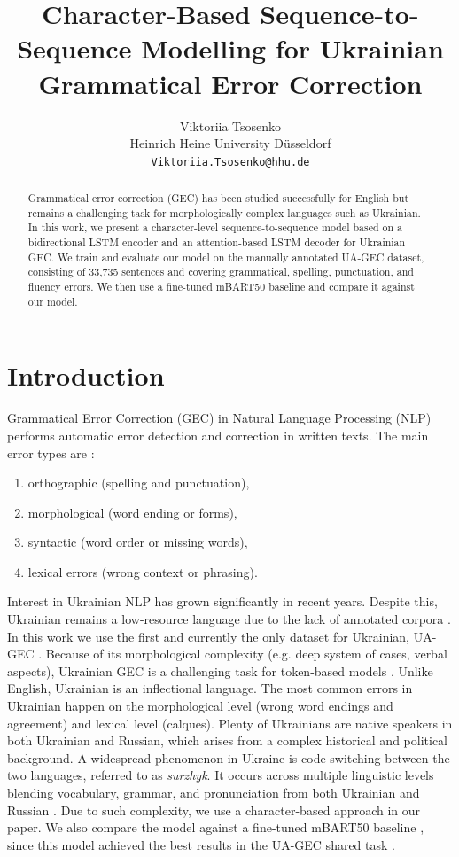 \documentclass[11pt]{article}
\title{Character-Based Sequence-to-Sequence Modelling for Ukrainian Grammatical Error Correction}
\author{Viktoriia Tsosenko \\
Heinrich Heine University D\"usseldorf \\
  \texttt{Viktoriia.Tsosenko@hhu.de} \\}
\begin{document}
\maketitle
\begin{abstract}
Grammatical error correction (GEC) has been studied successfully for English but remains a challenging task for morphologically complex languages such as Ukrainian. In this work, we present a character-level sequence-to-sequence model based on a bidirectional LSTM encoder and an attention-based LSTM decoder for Ukrainian GEC. We train and evaluate our model on the manually annotated UA-GEC dataset, consisting of 33,735 sentences and covering grammatical, spelling, punctuation, and fluency errors. We then use a fine-tuned mBART50 baseline and compare it against our model. 

\end{abstract}


\section{Introduction}
Grammatical Error Correction (GEC) in Natural Language Processing (NLP) performs automatic error detection and correction in written texts. The main error types are \citep {bryant-etal-2017-automatic}:
\begin{enumerate}[label=(\alph*)]
\item orthographic (spelling and punctuation),
\item morphological (word ending or forms), 
\item syntactic (word order or missing words), 
\item lexical errors (wrong context or phrasing). 
\end{enumerate}

Interest in Ukrainian NLP has grown significantly in recent years. Despite this, Ukrainian remains a low-resource language due to the lack of annotated corpora \citep {pogorilyy-kramov-2020-method}. In this work we use the first and currently the only dataset for Ukrainian, UA-GEC \citep{syvokon-etal-2023-ua}.
Because of its morphological complexity (e.g. deep system of cases, verbal aspects), Ukrainian GEC is a challenging task for token-based models \citep{bondarenko-etal-2023-comparative}. Unlike English, Ukrainian is an inflectional language. The most common errors in Ukrainian happen on the morphological level (wrong word endings and agreement) and lexical level (calques). Plenty of Ukrainians are native speakers in both Ukrainian and Russian, which arises from a complex historical and political background. A widespread phenomenon in Ukraine is code-switching between the two languages, referred to as  \textit{surzhyk}. It occurs across multiple linguistic levels blending vocabulary, grammar, and pronunciation from both Ukrainian and Russian \citep{hentschel2020ukrainisch}. Due to such complexity, we use a character-based approach in our paper. We also compare the model against a fine-tuned mBART50 baseline \citep{tang-etal-2021-multilingual}, since this model achieved the best results in the UA-GEC shared task \citep{uagec-2023}.
\end{document}
